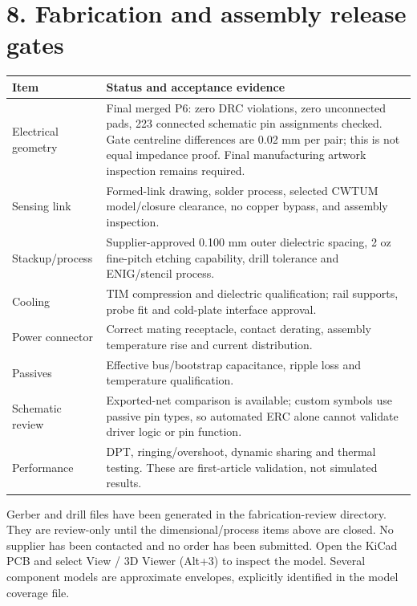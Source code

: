 \documentclass[10pt,a4paper]{article}
\begin{document}
\section*{8. Fabrication and assembly release gates}
\begin{longtable}{p{.31\linewidth}p{.63\linewidth}}\hline
Item & Status and acceptance evidence\\\hline
Electrical geometry & Final merged P6: zero DRC violations, zero unconnected pads, 223 connected schematic pin assignments checked. Gate centreline differences are 0.02 mm per pair; this is not equal impedance proof. Final manufacturing artwork inspection remains required.\\
Sensing link & Formed-link drawing, solder process, selected CWTUM model/closure clearance, no copper bypass, and assembly inspection.\\
Stackup/process & Supplier-approved 0.100 mm outer dielectric spacing, 2 oz fine-pitch etching capability, drill tolerance and ENIG/stencil process.\\
Cooling & TIM compression and dielectric qualification; rail supports, probe fit and cold-plate interface approval.\\
Power connector & Correct mating receptacle, contact derating, assembly temperature rise and current distribution.\\
Passives & Effective bus/bootstrap capacitance, ripple loss and temperature qualification.\\
Schematic review & Exported-net comparison is available; custom symbols use passive pin types, so automated ERC alone cannot validate driver logic or pin function.\\
Performance & DPT, ringing/overshoot, dynamic sharing and thermal testing. These are first-article validation, not simulated results.\\\hline
\end{longtable}
Gerber and drill files have been generated in the fabrication-review directory. They are review-only until the dimensional/process items above are closed. No supplier has been contacted and no order has been submitted. Open the KiCad PCB and select View / 3D Viewer (Alt+3) to inspect the model. Several component models are approximate envelopes, explicitly identified in the model coverage file.
\newpage
\end{document}
